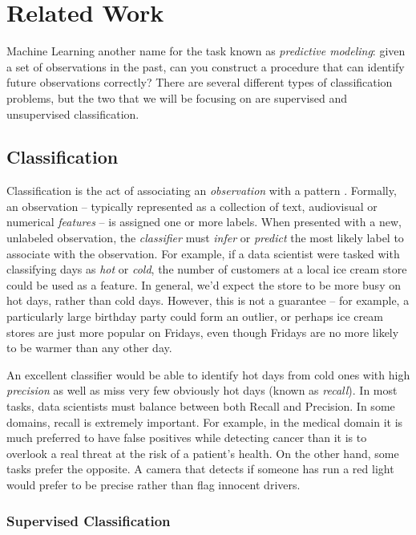 \chapter{Related Work}\label{sec:related}

Machine Learning another name for the task known as \textit{predictive modeling}: given a set of observations in the past, can you construct a procedure that can identify future observations correctly? There are several different types of classification problems, but the two that we will be focusing on are supervised and unsupervised classification. 

\section{Classification}

Classification is the act of associating an \textit{observation} with a pattern \cite{liu2007web}. Formally, an observation -- typically represented as a collection of text, audiovisual or numerical \textit{features} -- is assigned one or more labels. When presented with a new, unlabeled observation, the \textit{classifier} must \textit{infer} or \textit{predict} the most likely label to associate with the observation. For example, if a data scientist were tasked with classifying days as \textit{hot} or \textit{cold}, the number of customers at a local ice cream store could be used as a feature. In general, we'd expect the store to be more busy on hot days, rather than cold days. However, this is not a guarantee -- for example, a particularly large birthday party could form an outlier, or perhaps ice cream stores are just more popular on Fridays, even though Fridays are no more likely to be warmer than any other day.

An excellent classifier would be able to identify hot days from cold ones with high \textit{precision} as well as miss very few obviously hot days (known as \textit{recall}). In most tasks, data scientists must balance between both Recall and Precision. In some domains, recall is extremely important. For example, in the medical domain it is much preferred to have false positives while detecting cancer than it is to overlook a real threat at the risk of a patient's health.  On the other hand, some tasks prefer the opposite. A camera that detects if someone has run a red light would prefer to be precise rather than flag innocent drivers.

\subsection{Supervised Classification}

